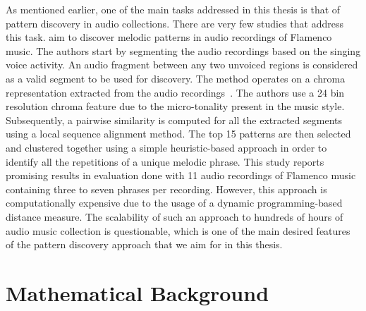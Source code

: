 As mentioned earlier, one of the main tasks addressed in this thesis is that of pattern discovery in audio collections. There are very few studies that address this task. \cite{kroher2015discovery} aim to discover melodic patterns in audio recordings of Flamenco music. The authors start by segmenting the audio recordings based on the singing voice activity. An audio fragment between any two unvoiced regions is considered as a valid segment to be used for discovery. The method operates on a chroma representation extracted from the audio recordings~\citep{bartsch2005audio}. The authors use a 24 bin resolution chroma feature due to the micro-tonality present in the music style. Subsequently, a pairwise similarity is computed for all the extracted segments using a local sequence alignment method. The top 15 patterns are then selected and clustered together using a simple heuristic-based approach in order to identify all the repetitions of a unique melodic phrase. This study reports promising results in evaluation done with 11 audio recordings of Flamenco music containing three to seven phrases per recording. However, this approach is computationally expensive due to the usage of a dynamic programming-based distance measure. The scalability of such an approach to hundreds of hours of audio music collection is questionable, which is one of the main desired features of the pattern discovery approach that we aim for in this thesis. 



%
%


%
\section{Mathematical Background}
\label{sec:background_scientific_background}

